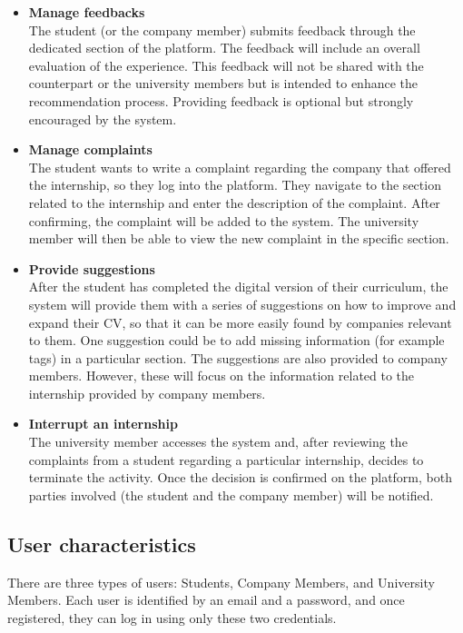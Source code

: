 \begin{itemize}
      \item \textbf{Manage feedbacks} \\
      The student (or the company member) submits feedback through the dedicated section of the platform. The feedback will include an overall evaluation of the experience. This feedback will not be shared with the counterpart or the university members but is intended to enhance the recommendation process. Providing feedback is optional but strongly encouraged by the system.
      
      \item \textbf{Manage complaints} \\
      The student wants to write a complaint regarding the company that offered the internship, so they log into the platform. They navigate to the section related to the internship and enter the description of the complaint. After confirming, the complaint will be added to the system. The university member will then be able to view the new complaint in the specific section.

      \item \textbf{Provide suggestions} \\
      After the student has completed the digital version of their curriculum, the system will provide them with a series of suggestions on how to improve and expand their CV, so that it can be more easily found by companies relevant to them. One suggestion could be to add missing information (for example tags) in a particular section. The suggestions are also provided to company members. However, these will focus on the information related to the internship provided by company members.

      \item \textbf{Interrupt an internship} \\
      The university member accesses the system and, after reviewing the complaints from a student regarding a particular internship, decides to terminate the activity. Once the decision is confirmed on the platform, both parties involved (the student and the company member) will be notified.
\end{itemize}

\subsection{User characteristics}
There are three types of users: Students, Company Members, and University Members. Each user is identified by an email and a password, and once registered, 
they can log in using only these two credentials.

